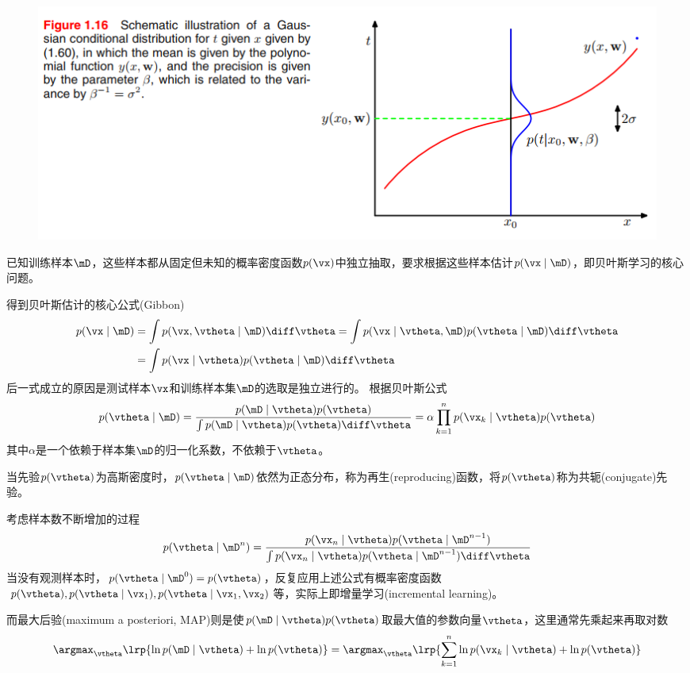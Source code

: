 \begin{figure}[H]
\centering
\includegraphics[width=0.8\linewidth]{fig/bayesian_est.png}
\end{figure}

已知训练样本$\mD$，这些样本都从固定但未知的概率密度函数$p(\vx)$中独立抽取，要求根据这些样本估计$p(\vx\mid\mD)$，即贝叶斯学习的核心问题。

得到贝叶斯估计的核心公式(Gibbon)
\[\begin{aligned}
p(\vx\mid\mD)&=\int p(\vx,\vtheta\mid\mD)\diff\vtheta
=\int p(\vx\mid\vtheta,\mD)p(\vtheta\mid\mD)\diff\vtheta\\
&=\int p(\vx\mid\vtheta)p(\vtheta\mid\mD)\diff\vtheta
\end{aligned}\]
后一式成立的原因是测试样本$\vx$和训练样本集$\mD$的选取是独立进行的。
根据贝叶斯公式
\[p(\vtheta\mid\mD)=\frac{p(\mD\mid\vtheta)p(\vtheta)}{\int p(\mD\mid\vtheta)p(\vtheta)\diff\vtheta}=\alpha\prod_{k=1}^np(\vx_k\mid\vtheta)p(\vtheta)\]
其中$\alpha$是一个依赖于样本集$\mD$的归一化系数，不依赖于$\vtheta$。

当先验$p(\vtheta)$为高斯密度时，$p(\vtheta\mid\mD)$依然为正态分布，称为再生(reproducing)函数，将$p(\vtheta)$称为共轭(conjugate)先验。

考虑样本数不断增加的过程
\[p(\vtheta\mid\mD^n)=\frac{p(\vx_n\mid\vtheta)p(\vtheta\mid\mD^{n-1})}{\int p(\vx_n\mid\vtheta)p(\vtheta\mid\mD^{n-1})\diff\vtheta}\]
当没有观测样本时，$p(\vtheta\mid\mD^0)=p(\vtheta)$，反复应用上述公式有概率密度函数$p(\vtheta),p(\vtheta\mid\vx_1),p(\vtheta\mid\vx_1,\vx_2)$等，实际上即增量学习(incremental learning)。

而最大后验(maximum a posteriori, MAP)则是使$p(\mD\mid\vtheta)p(\vtheta)$取最大值的参数向量$\vtheta$，这里通常先乘起来再取对数
\[\argmax_{\vtheta} \lrp{\ln p(\mD\mid\vtheta) + \ln p(\vtheta)}
=\argmax_{\vtheta}\lrp{\sum_{k=1}^n\ln p(\vx_k\mid\vtheta)+\ln p(\vtheta)}\]

